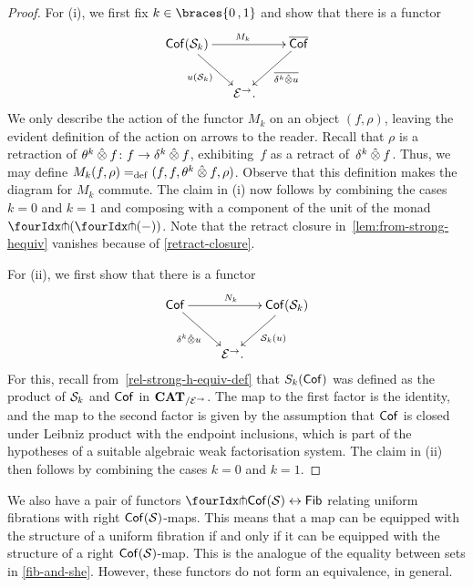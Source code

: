 \documentclass[reqno,10pt,a4paper,oneside,draft]{amsart}
\begin{document}
{{\begin{proof} For (i), we first fix $k \in \braces{0 \, , 1 }$ and show that there is a functor
\begin{equation}
\label{lem:from-strong-hequiv}
\begin{gathered}
\xymatrix@!C@C-2em{
 \Cof( \cal{S}_k)
  \ar[dr]_{u(\cal{S}_k)}
  \ar[rr]^{M_k}
&&
  \overline{\Cof}
  \ar[dl]^-{\overline{\kcyl \hatotimes u}}
\\&
  \catE^\to
\rlap{.}}
\end{gathered}
\end{equation}
We only describe the action of the functor $M_k$ on an object $(f, \rho)$, leaving the evident definition of the action on arrows to the reader.
Recall that $\rho$ is a retraction of $\thetak \hatotimes f \co f \to \kcyl \hatotimes f$, exhibiting~$f$ as a retract of~$\kcyl \hatotimes f$.
Thus, we may define $M_k(f, \rho) \defeq (f, f, \thetak \hatotimes f, \rho)$.
Observe that this definition makes the diagram for $M_k$ commute. The claim in (i) now follows by combining 
the cases $k = 0$ and $k = 1$ and composing with a component of the unit of the monad $\liftl{(\liftr{(-)})}$.
Note that the retract closure in~\eqref{lem:from-strong-hequiv} vanishes because of \cref{retract-closure}.


For (ii), we first show that there is a functor
\[
\xymatrix@!C@C-2em{
  \Cof
  \ar[dr]_{\kcyl \hatotimes u} \ar[rr]^{N_k}
&&
  \Cof(\cal{S}_k)
  \ar[dl]^{\cal{S}_k(u)}
\\&
   \catE^\to
\rlap{.}}
\]
For this, recall from~\eqref{rel-strong-h-equiv-def} that $S_k(\Cof)$ was defined as the product of $\cal{S}_k$ and $\Cof$  
in $\CAT_{/\cal{E}^\to}$. The map to the first factor is the identity, and the map to the second factor is given by the assumption that $\Cof$ is closed under Leibniz product with the endpoint inclusions, which is part of the hypotheses of a suitable algebraic weak factorisation system.
The claim in (ii) then follows by combining the cases $k = 0$ and $k = 1$.
\end{proof}



\begin{remark} \label{relating-strong-hequiv-and-uniform-fib}
We also have a pair of functors $\liftr{\Cof(\cal{S})} \leftrightarrow \Fib$ relating uniform fibrations with right $\Cof(\cal{S})$-maps. This means that a map can be equipped with the
structure of a uniform fibration if and only if it can be equipped with the structure of a right $\Cof(\cal{S})$-map. This is the analogue of the equality between sets in \cref{fib-and-she}.
However, these functors do not form an equivalence, in general.
\end{remark}

}}
\end{document}
